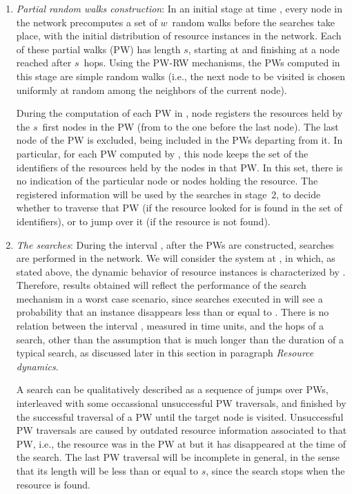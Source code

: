 \documentclass[]{elsarticle}
\newcommand{\s}		{\ensuremath{s}}		\newcommand{\sopt}	{\ensuremath{s_{opt}}}		\newcommand{\p}		{\ensuremath{p}}		\newcommand{\W}		{\ensuremath{W}}		\newcommand{\w}		{\ensuremath{w}}		\newcommand{\lsave}	{\ensuremath{\overline{l}_s}}	\newcommand{\lave}	{\ensuremath{\overline{l}}}	\newcommand{\lopt}	{\ensuremath{\overline{l}_{opt}}}
\begin{document}
\begin{enumerate}
\label{point1}
\item
\emph{Partial random walks construction}: In an initial stage at time , every node  in the network precomputes a set  of \w\ random walks before the searches take place, with the initial distribution of resource instances in the network. Each of these partial walks (PW) has length \s, starting at  and finishing at a node reached after \s\ hops. Using the PW-RW mechanisms, the PWs computed in this stage are simple random walks (i.e., the next node to be visited is chosen uniformly at random among the neighbors of the current node).

During the computation of each PW in , node  registers the resources held by the \s\ first nodes in the PW (from  to the one before the last node). The last node of the PW is excluded, being included in the PWs departing from it. 
In particular, for each PW computed by , this node keeps the set of the identifiers of the resources held by the nodes in that PW. In this set, there is no indication of the particular node or nodes holding the resource.
The registered information will be used by the searches in stage~2,
to decide whether to traverse that PW (if the resource looked for is found in the set of identifiers), or to jump over it (if the resource is not found).

\item
\label{point2}
\emph{The searches}: During the interval , after the PWs are constructed, searches are performed in the network. We will consider the system at , in which, as stated above, the dynamic behavior of resource instances is characterized by \pd. Therefore, results obtained will reflect the performance of the search mechanism in a worst case scenario, since searches executed in  will see a probability that an instance disappears less than or equal to \pd.
There is no relation between the interval , measured in time units, and the hops of a search, other than the assumption that  is much longer than the duration of a typical search, as discussed later in this section in paragraph \emph{Resource dynamics}. 

A search can be qualitatively described as a sequence of jumps over PWs, interleaved with some occassional unsuccessful PW traversals, and finished by the successful traversal of a PW until the target node is visited. 
Unsuccessful PW traversals are caused by outdated resource information associated to that PW, i.e., the resource was in the PW at  but it has disappeared at the time of the search.
The last PW traversal will be incomplete in general, in the sense that its length will be less than or equal to \s, since the search stops when the resource is found. 


\end{enumerate}
\end{document}
